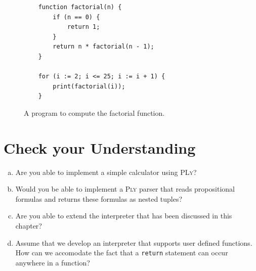\begin{figure}[!ht]
\centering
\begin{verbatim}
    function factorial(n) {
        if (n == 0) {
            return 1;
        }
        return n * factorial(n - 1);
    }
    
    for (i := 2; i <= 25; i := i + 1) {
        print(factorial(i));
    }                 
\end{verbatim}
\vspace*{-0.3cm}
\caption{A program to compute the factorial function.}
\label{fig:factorial.sl}
\end{figure}
\pagebreak

\section{Check your Understanding}
\begin{enumerate}[(a)]
\item Are you able to implement a simple calculator using \textsc{PLy}?
\item Would you be able to implement a \textsc{Ply} parser that reads propositional formulas and returns these
      formulas as nested tuples? 
\item Are you able to extend the interpreter that has been discussed in this chapter?
\item Assume that we develop an interpreter that supports user defined functions.
      How can we accomodate the fact that a \texttt{return} statement can occur anywhere in a function? 
\end{enumerate}



